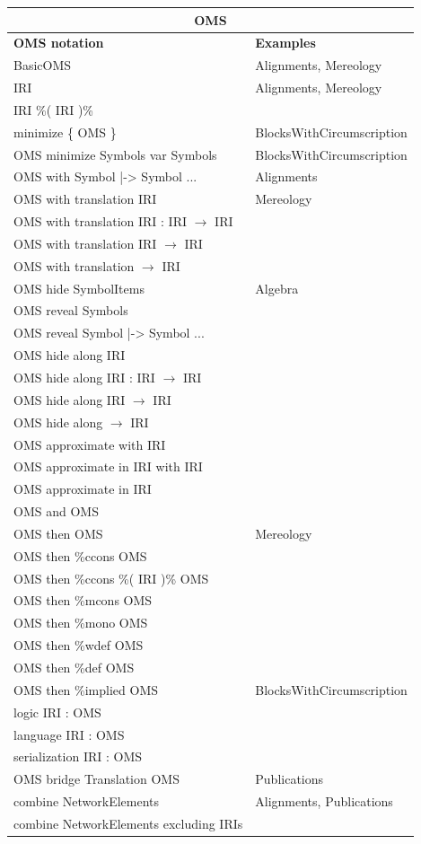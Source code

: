 \documentclass[10pt,fleqn,%
\ifpretendfinal
final%
\else
draft%
\fi,
]{scrreprt}
\begin{document}
\begin{tabular}{|l|l|}\hline
\multicolumn{2}{|c|}{\textbf{OMS}}\\\hline
\textbf{OMS notation} & \textbf{Examples} \\\hline
BasicOMS  & Alignments, Mereology \\\hline
IRI  & Alignments, Mereology \\\hline
IRI \%( IRI )\%  &  \\\hline
minimize \{ OMS \}  & BlocksWithCircumscription \\\hline
OMS minimize Symbols var Symbols  & BlocksWithCircumscription \\\hline
OMS with Symbol |-> Symbol ...  & Alignments \\\hline
OMS with translation IRI  & Mereology \\\hline
OMS with translation IRI : IRI $\to$ IRI  &  \\\hline
OMS with translation IRI $\to$ IRI  &  \\\hline
OMS with translation $\to$ IRI  &  \\\hline
OMS hide SymbolItems  &  Algebra \\\hline
OMS reveal Symbols  &  \\\hline
OMS reveal Symbol |-> Symbol ...  &  \\\hline
OMS hide along IRI  &  \\\hline
OMS hide along IRI : IRI $\to$ IRI  &  \\\hline
OMS hide along IRI $\to$ IRI  &  \\\hline
OMS hide along $\to$ IRI  &  \\\hline
OMS approximate with IRI   &  \\\hline
OMS approximate in IRI with IRI   &  \\\hline
OMS approximate in IRI  &  \\\hline
OMS and OMS   &  \\\hline
OMS then OMS  & Mereology \\\hline
OMS then \%ccons OMS  &  \\\hline
OMS then \%ccons \%( IRI )\% OMS  &  \\\hline
OMS then \%mcons OMS  &  \\\hline
OMS then \%mono OMS  &  \\\hline
OMS then \%wdef OMS  &  \\\hline
OMS then \%def OMS  &  \\\hline
OMS then \%implied OMS  &  BlocksWithCircumscription \\\hline
logic IRI : OMS  &  \\\hline
language IRI : OMS  &  \\\hline
serialization IRI : OMS  &  \\\hline
OMS bridge Translation OMS  & Publications \\\hline
combine NetworkElements  & Alignments, Publications \\\hline
combine NetworkElements excluding IRIs  &  \\\hline
\end{tabular}
\end{document}
